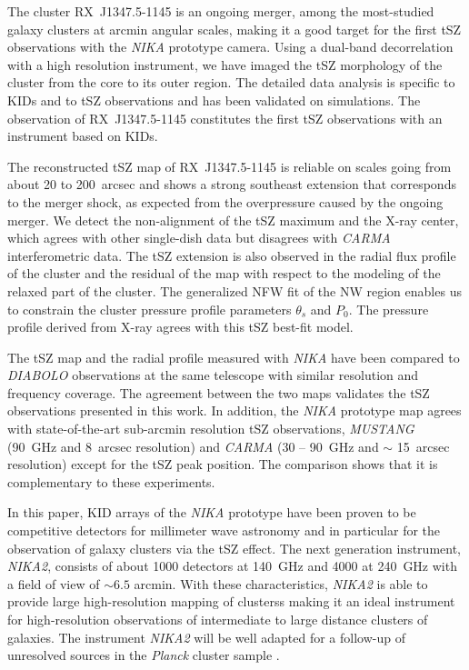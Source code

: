 The cluster RX~J1347.5-1145 is an ongoing merger, among the most-studied galaxy clusters at arcmin angular scales, making it a good target for the first tSZ observations with the {\it NIKA} prototype camera. Using a dual-band decorrelation with a high resolution instrument, we have imaged the tSZ morphology of the cluster from the core to its outer region. The detailed data analysis is specific to KIDs and to tSZ observations and has been validated on simulations. The observation of \mbox{RX~J1347.5-1145} constitutes the first tSZ observations with an instrument based on KIDs.

The reconstructed tSZ map of \mbox{RX~J1347.5-1145} is reliable on scales going from about 20 to 200~arcsec and shows a strong southeast extension that corresponds to the merger shock, as expected from the overpressure caused by the ongoing merger. We detect the non-alignment of the tSZ maximum and the \mbox{X-ray} center, which agrees with other single-dish data but disagrees with {\it CARMA} interferometric data. The tSZ extension is also observed in the radial flux profile of the cluster and the residual of the map with respect to the modeling of the relaxed part of the cluster. The generalized NFW fit of the NW region enables us to constrain the cluster pressure profile parameters $\theta_s$ and $P_0$. The pressure profile derived from \mbox{X-ray} agrees with this tSZ best-fit model.

The tSZ map and the radial profile measured with {\it NIKA} have been compared to {\it DIABOLO} observations at the same telescope with similar resolution and frequency coverage. The agreement between the two maps validates the tSZ observations presented in this work. In addition, the {\it NIKA} prototype map agrees with state-of-the-art sub-arcmin resolution tSZ observations, {\it MUSTANG} (90~GHz and 8~arcsec resolution) and {\it CARMA} (30 -- 90~GHz and $\sim$ 15~arcsec resolution) except for the tSZ peak position. The comparison shows that it is complementary to these experiments.

In this paper, KID arrays of the {\it NIKA} prototype have been proven to be competitive detectors for millimeter wave astronomy and in particular for the observation of galaxy clusters via the tSZ effect. The next generation instrument, {\it NIKA2}, consists of about 1000 detectors at 140~GHz and 4000 at 240~GHz with a field of view of  $\sim 6.5$ arcmin. With these characteristics, {\it NIKA2} is able to provide large high-resolution mapping of clusterss making it an ideal instrument for high-resolution observations of intermediate to large distance clusters of galaxies. The instrument {\it NIKA2} will be well adapted for a follow-up of unresolved sources in the {\it Planck} cluster sample \citep{Planck_survey}. 
